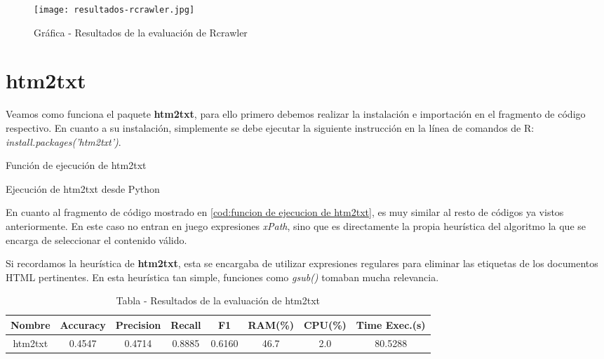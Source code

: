 \begin{figure}[tphb]
    \centering
    \texttt{[image: resultados-rcrawler.jpg]}
    \caption{Gráfica - Resultados de la evaluación de Rcrawler}
    \label{img:grafica - resultados de la evaluacion de rcrawler}
\end{figure}

\section*{htm2txt}

Veamos como funciona el paquete \textbf{htm2txt}, para ello primero debemos realizar la instalación e
importación en el fragmento de código respectivo. En cuanto a su instalación, simplemente se debe ejecutar
la siguiente instrucción en la línea de comandos de R: \emph{install.packages('htm2txt')}.

\begin{codefloat}
    
    \caption{Función de ejecución de htm2txt}
    \label{cod:funcion de ejecucion de htm2txt}
\end{codefloat}

\begin{codefloat}
    
    \caption{Ejecución de htm2txt desde Python}
    \label{cod:ejecucion de htm2txt desde python}
\end{codefloat}

En cuanto al fragmento de código mostrado en \ref{cod:funcion de ejecucion de htm2txt}, es muy similar al
resto de códigos ya vistos anteriormente. En este caso no entran en juego expresiones \emph{xPath}, sino
que es directamente la propia heurística del algoritmo la que se encarga de seleccionar el contenido válido.

Si recordamos la heurística de \textbf{htm2txt}, esta se encargaba de utilizar expresiones regulares para
eliminar las etiquetas de los documentos HTML pertinentes. En esta heurística tan simple, funciones como 
\emph{gsub()} tomaban mucha relevancia.

\begin{table}[h]
    \begin{center}
      \begin{tabular}{| c | c | c | c | c | c | c | c |} \hline 
       \textbf{Nombre} & \textbf{Accuracy} & \textbf{Precision}  & \textbf{Recall} & \textbf{F1} & \textbf{RAM(\%)} & \textbf{CPU(\%)} & \textbf{Time Exec.(s)} \\ \hline
       htm2txt & 0.4547 & 0.4714 & 0.8885 & 0.6160 & 46.7 & 2.0 & 80.5288 \\ \hline
      \end{tabular}
      \caption{Tabla - Resultados de la evaluación de htm2txt}
      \label{tab:tabla - resultados de la evaluacion de htm2txt}
    \end{center}
\end{table}

